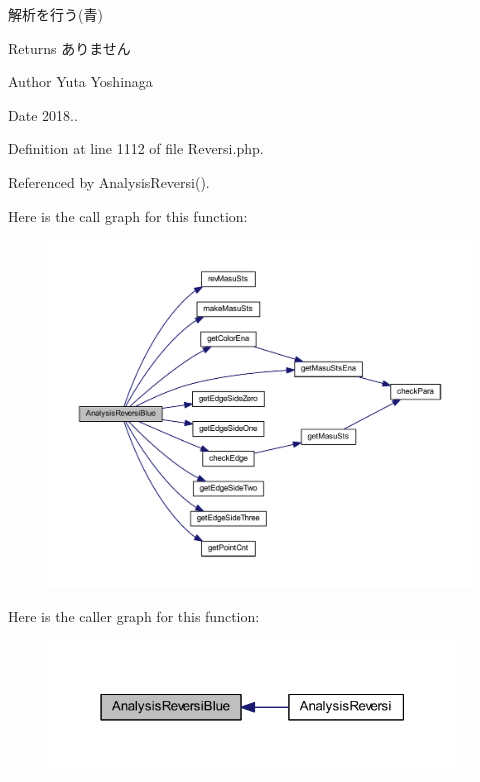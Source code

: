 解析を行う(青) 

\begin{DoxyReturn}{Returns}
ありません 
\end{DoxyReturn}
\begin{DoxyAuthor}{Author}
Yuta Yoshinaga 
\end{DoxyAuthor}
\begin{DoxyDate}{Date}
2018.. 
\end{DoxyDate}


Definition at line 1112 of file Reversi.\+php.



Referenced by Analysis\+Reversi().

Here is the call graph for this function\+:
\nopagebreak
\begin{figure}[H]
\begin{center}
\leavevmode
\includegraphics[width=350pt]{class_reversi_a3b581c4861bda72706a1d7146c910ad2_cgraph}
\end{center}
\end{figure}
Here is the caller graph for this function\+:
\nopagebreak
\begin{figure}[H]
\begin{center}
\leavevmode
\includegraphics[width=307pt]{class_reversi_a3b581c4861bda72706a1d7146c910ad2_icgraph}
\end{center}
\end{figure}
\mbox{\label{class_reversi_ad44cfa7c45a98365df2d6db094d61901}} 

